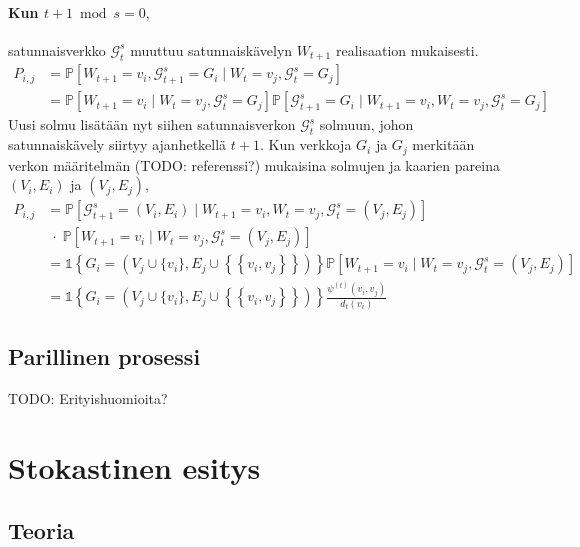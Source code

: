 \documentclass[finnish, 12pt, a4paper, sci, utf8, pdfa]{aaltothesis}
\newcommand{\indicator}{\mathopen{\mathds{1}}}
\newcommand*{\prob}{\mathbb{P}}
\begin{document}
\paragraph{Kun $ t + 1 \bmod s = 0, $} satunnaisverkko $ \mathcal{G}^{s}_{t} $ muuttuu satunnaiskävelyn $ W_{t+1} $ realisaation mukaisesti.
\begin{align*}
   P_{i,j} &= \prob \left[ W_{t+1} = v_{i}, \mathcal{G}^{s}_{t+1} = G_{i} \mid W_{t} = v_{j}, \mathcal{G}^{s}_{t} = G_{j} \right] \\
   \quad &= \prob \left[ W_{t+1} = v_{i} \mid W_{t} = v_{j}, \mathcal{G}^{s}_{t} = G_{j} \right] \prob \left[ \mathcal{G}^{s}_{t+1} = G_{i} \mid W_{t+1} = v_{i}, W_{t} = v_{j}, \mathcal{G}^{s}_{t} = G_{j} \right]
\end{align*}
Uusi solmu lisätään nyt siihen satunnaisverkon $ \mathcal{G}^{s}_{t} $ solmuun, johon satunnaiskävely siirtyy ajanhetkellä $ t + 1 $. Kun verkkoja $ G_{i} $ ja $ G_{j} $ merkitään verkon määritelmän (TODO: referenssi?) mukaisina solmujen ja kaarien pareina $ (V_{i}, E_{i}) $ ja $ (V_{j}, E_{j}) $,
\begin{align*}
   P_{i,j} &= \prob \left[ \mathcal{G}^{s}_{t+1} = (V_{i}, E_{i}) \mid W_{t+1} = v_{i}, W_{t} = v_{j}, \mathcal{G}^{s}_{t} = (V_{j}, E_{j}) \right] \\
           & \; \cdot \; \prob \left[ W_{t+1} = v_{i} \mid W_{t} = v_{j}, \mathcal{G}^{s}_{t} = (V_{j}, E_{j}) \right] \\
           &= \indicator \left\{ G_{i} = (V_{j} \cup \{ v_{i} \}, E_{j} \cup \left\{ \left\{ v_{i}, v_{j} \right\} \right\}) \right\} \prob \left[ W_{t+1} = v_{i} \mid W_{t} = v_{j}, \mathcal{G}^{s}_{t} = (V_{j}, E_{j}) \right] \\
           &= \indicator \left\{ G_{i} = (V_{j} \cup \{ v_{i} \}, E_{j} \cup \left\{ \left\{ v_{i}, v_{j} \right\} \right\}) \right\} \frac{\psi^{(t)}(v_{i}, v_{j})}{d_{t}(v_{i})}
\end{align*}

\subsection{Parillinen prosessi}

TODO: Erityishuomioita?

\section{Stokastinen esitys}

\subsection{Teoria}
\end{document}
